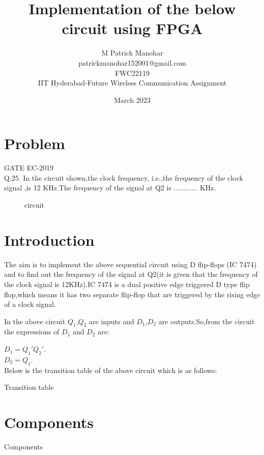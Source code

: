 \documentclass{article}
\title{Implementation of the below circuit using FPGA}
\date{March 2023}
\author{M Patrick Manohar\\patrickmanohar152001@gmail.com\\FWC22119\\IIT Hyderabad-Future Wireless Communication Assignment}
\begin{document}
\maketitle
  \tableofcontents

\pagebreak

\section{Problem}
  {GATE EC-2019}\\
  Q.25. In the circuit shown,the clock frequency, i.e.,the frequency of the clock signal ,is 12 KHz.The frequency of the signal at Q2 is ............ KHz.
  \begin{figure}[h]
  \centering
    
    \caption{circuit}
    \label{fig:1}
  \end{figure}

\section{Introduction}
    
    The aim is to implement the above sequential circuit using D flip-flops (IC 7474) and to find out the frequency of the signal at Q2(it is given that the frequency of the clock signal is 12KHz).IC 7474 is a dual positive edge triggered D type flip flop,which means it has two separate flip-flop that are triggered by the rising edge of a clock signal.

    In the above circuit $Q_1$,$Q_2$ are inputs and $D_1$,$D_2$ are outputs.So,from the circuit the expressions of $D_1$ and $D_2$ are:

    $D_1 = Q_1'Q_2'$.\\
      $D_2 = Q_1$.\\

Below is the transition table of the above circuit which is as follows:
\pagebreak

  \begin{table}[h]
    \begin{center}
      
      \caption{Transition table}
      \label{table:2}
    \end{center}
  \end{table}

\section{Components}
  
  \begin{table}[h]
    \begin{center}
      
      \caption{Components}
      \label{table:1}
    \end{center}
  \end{table}
\end{document}
